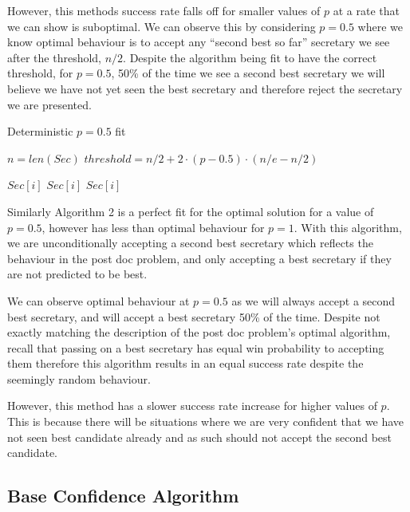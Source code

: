 \documentclass[a4paper,11pt]{article}
\begin{document}
However, this methods success rate falls off for smaller values of $p$ at a rate that we can show is suboptimal. We can observe this by considering $p = 0.5$ where we know optimal behaviour is to accept any ``second best so far'' secretary we see after the threshold, $n/2$. Despite the algorithm being fit to have the correct threshold, for $p = 0.5$, 50\% of the time we see a second best secretary we will believe we have not yet seen the best secretary and therefore reject the secretary we are presented. 
\begin{algorithm}[H]
\caption{Deterministic $p = 0.5$ fit}
\begin{algorithmic}[1]

\State $n = len(Sec)$
\State $threshold = n/2 + 2 \cdot (p-0.5) \cdot (n/e - n/2)$

            \State \Return $Sec[i]$
            \State \Return $Sec[i]$
        \EndIf
    \EndFor
    \State \Return $Sec[i]$
\EndProcedure
\end{algorithmic}
\end{algorithm}

Similarly Algorithm 2 is a perfect fit for the optimal solution for a value of $p = 0.5$, however has less than optimal behaviour for $p = 1$. With this algorithm, we are unconditionally accepting a second best secretary which reflects the behaviour in the post doc problem, and only accepting a best secretary if they are not predicted to be best.

We can observe optimal behaviour at $p = 0.5$ as we will always accept a second best secretary, and will accept a best secretary 50\% of the time. Despite not exactly matching the description of the post doc problem's optimal algorithm, recall that passing on a best secretary has equal win probability to accepting them therefore this algorithm results in an equal success rate despite the seemingly random behaviour.

However, this method has a slower success rate increase for higher values of $p$. This is because there will be situations where we are very confident that we have not seen best candidate already and as such should not accept the second best candidate.

\subsection{Base Confidence Algorithm}
\end{document}
